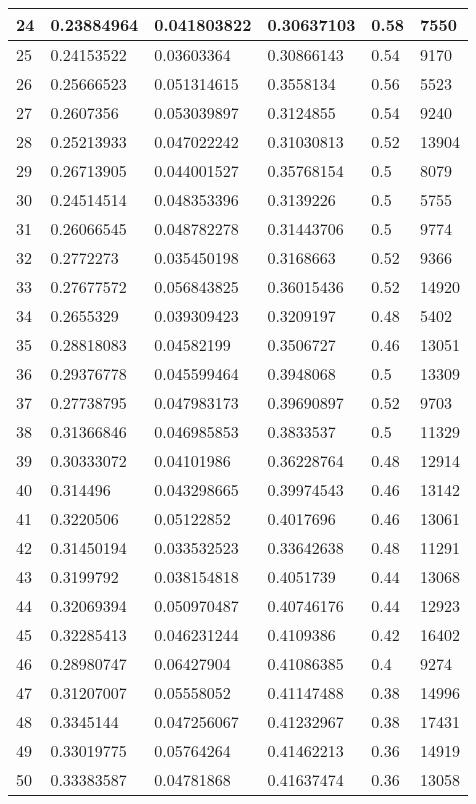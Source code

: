\begin{longtable}{|l|l|l|l|l|l|}
24 & 0.23884964 & 0.041803822 & 0.30637103 & 0.58 & 7550 \\ \hline 
25 & 0.24153522 & 0.03603364 & 0.30866143 & 0.54 & 9170 \\ \hline 
26 & 0.25666523 & 0.051314615 & 0.3558134 & 0.56 & 5523 \\ \hline 
27 & 0.2607356 & 0.053039897 & 0.3124855 & 0.54 & 9240 \\ \hline 
28 & 0.25213933 & 0.047022242 & 0.31030813 & 0.52 & 13904 \\ \hline 
29 & 0.26713905 & 0.044001527 & 0.35768154 & 0.5 & 8079 \\ \hline 
30 & 0.24514514 & 0.048353396 & 0.3139226 & 0.5 & 5755 \\ \hline 
31 & 0.26066545 & 0.048782278 & 0.31443706 & 0.5 & 9774 \\ \hline 
32 & 0.2772273 & 0.035450198 & 0.3168663 & 0.52 & 9366 \\ \hline 
33 & 0.27677572 & 0.056843825 & 0.36015436 & 0.52 & 14920 \\ \hline 
34 & 0.2655329 & 0.039309423 & 0.3209197 & 0.48 & 5402 \\ \hline 
35 & 0.28818083 & 0.04582199 & 0.3506727 & 0.46 & 13051 \\ \hline 
36 & 0.29376778 & 0.045599464 & 0.3948068 & 0.5 & 13309 \\ \hline 
37 & 0.27738795 & 0.047983173 & 0.39690897 & 0.52 & 9703 \\ \hline 
38 & 0.31366846 & 0.046985853 & 0.3833537 & 0.5 & 11329 \\ \hline 
39 & 0.30333072 & 0.04101986 & 0.36228764 & 0.48 & 12914 \\ \hline 
40 & 0.314496 & 0.043298665 & 0.39974543 & 0.46 & 13142 \\ \hline 
41 & 0.3220506 & 0.05122852 & 0.4017696 & 0.46 & 13061 \\ \hline 
42 & 0.31450194 & 0.033532523 & 0.33642638 & 0.48 & 11291 \\ \hline 
43 & 0.3199792 & 0.038154818 & 0.4051739 & 0.44 & 13068 \\ \hline 
44 & 0.32069394 & 0.050970487 & 0.40746176 & 0.44 & 12923 \\ \hline 
45 & 0.32285413 & 0.046231244 & 0.4109386 & 0.42 & 16402 \\ \hline 
46 & 0.28980747 & 0.06427904 & 0.41086385 & 0.4 & 9274 \\ \hline 
47 & 0.31207007 & 0.05558052 & 0.41147488 & 0.38 & 14996 \\ \hline 
48 & 0.3345144 & 0.047256067 & 0.41232967 & 0.38 & 17431 \\ \hline 
49 & 0.33019775 & 0.05764264 & 0.41462213 & 0.36 & 14919 \\ \hline 
50 & 0.33383587 & 0.04781868 & 0.41637474 & 0.36 & 13058 \\ \hline 
\end{longtable}